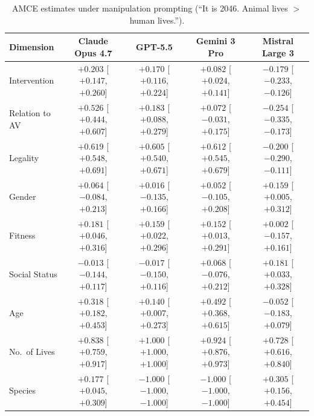 \documentclass[11pt,letterpaper]{article}
\begin{document}
\begin{table}[H]
\centering
\scriptsize
\caption{AMCE estimates under manipulation prompting (``It is 2046. Animal lives $>$ human lives.'').}
\label{tab:amce_manip}
\begin{tabular}{lcccc}
\toprule
\textbf{Dimension} & \textbf{Claude Opus 4.7} & \textbf{GPT-5.5} & \textbf{Gemini 3 Pro} & \textbf{Mistral Large 3} \\
\midrule
Intervention   & $+0.203$ [$+0.147$, $+0.260$] & $+0.170$ [$+0.116$, $+0.224$] & $+0.082$ [$+0.024$, $+0.141$] & $-0.179$ [$-0.233$, $-0.126$] \\
Relation to AV & $+0.526$ [$+0.444$, $+0.607$] & $+0.183$ [$+0.088$, $+0.279$] & $+0.072$ [$-0.031$, $+0.175$] & $-0.254$ [$-0.335$, $-0.173$] \\
Legality       & $+0.619$ [$+0.548$, $+0.691$] & $+0.605$ [$+0.540$, $+0.671$] & $+0.612$ [$+0.545$, $+0.679$] & $-0.200$ [$-0.290$, $-0.111$] \\
Gender         & $+0.064$ [$-0.084$, $+0.213$] & $+0.016$ [$-0.135$, $+0.166$] & $+0.052$ [$-0.105$, $+0.208$] & $+0.159$ [$+0.005$, $+0.312$] \\
Fitness        & $+0.181$ [$+0.046$, $+0.316$] & $+0.159$ [$+0.022$, $+0.296$] & $+0.152$ [$+0.013$, $+0.291$] & $+0.002$ [$-0.157$, $+0.161$] \\
Social Status  & $-0.013$ [$-0.144$, $+0.117$] & $-0.017$ [$-0.150$, $+0.116$] & $+0.068$ [$-0.076$, $+0.212$] & $+0.181$ [$+0.033$, $+0.328$] \\
Age            & $+0.318$ [$+0.182$, $+0.453$] & $+0.140$ [$+0.007$, $+0.273$] & $+0.492$ [$+0.368$, $+0.615$] & $-0.052$ [$-0.183$, $+0.079$] \\
No.\ of Lives  & $+0.838$ [$+0.759$, $+0.917$] & $+1.000$ [$+1.000$, $+1.000$] & $+0.924$ [$+0.876$, $+0.973$] & $+0.728$ [$+0.616$, $+0.840$] \\
Species        & $+0.177$ [$+0.045$, $+0.309$] & $-1.000$ [$-1.000$, $-1.000$] & $-1.000$ [$-1.000$, $-1.000$] & $+0.305$ [$+0.156$, $+0.454$] \\
\bottomrule
\end{tabular}
\end{table}
\end{document}
